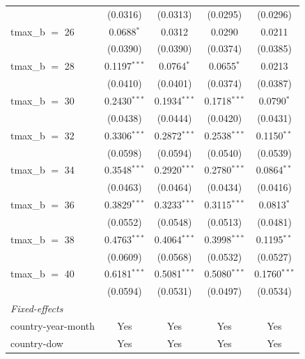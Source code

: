 \begin{tabular}{lcccc}
                      & (0.0316)       & (0.0313)         & (0.0295)            & (0.0296)\\   
   tmax\_b $=$ 26     & 0.0688$^{*}$   & 0.0312           & 0.0290              & 0.0211\\   
                      & (0.0390)       & (0.0390)         & (0.0374)            & (0.0385)\\   
   tmax\_b $=$ 28     & 0.1197$^{***}$ & 0.0764$^{*}$     & 0.0655$^{*}$        & 0.0213\\   
                      & (0.0410)       & (0.0401)         & (0.0374)            & (0.0387)\\   
   tmax\_b $=$ 30     & 0.2430$^{***}$ & 0.1934$^{***}$   & 0.1718$^{***}$      & 0.0790$^{*}$\\   
                      & (0.0438)       & (0.0444)         & (0.0420)            & (0.0431)\\   
   tmax\_b $=$ 32     & 0.3306$^{***}$ & 0.2872$^{***}$   & 0.2538$^{***}$      & 0.1150$^{**}$\\   
                      & (0.0598)       & (0.0594)         & (0.0540)            & (0.0539)\\   
   tmax\_b $=$ 34     & 0.3548$^{***}$ & 0.2920$^{***}$   & 0.2780$^{***}$      & 0.0864$^{**}$\\   
                      & (0.0463)       & (0.0464)         & (0.0434)            & (0.0416)\\   
   tmax\_b $=$ 36     & 0.3829$^{***}$ & 0.3233$^{***}$   & 0.3115$^{***}$      & 0.0813$^{*}$\\   
                      & (0.0552)       & (0.0548)         & (0.0513)            & (0.0481)\\   
   tmax\_b $=$ 38     & 0.4763$^{***}$ & 0.4064$^{***}$   & 0.3998$^{***}$      & 0.1195$^{**}$\\   
                      & (0.0609)       & (0.0568)         & (0.0532)            & (0.0527)\\   
   tmax\_b $=$ 40     & 0.6181$^{***}$ & 0.5081$^{***}$   & 0.5080$^{***}$      & 0.1760$^{***}$\\   
                      & (0.0594)       & (0.0531)         & (0.0497)            & (0.0534)\\   
   \midrule
   \emph{Fixed-effects}\\
   country-year-month & Yes            & Yes              & Yes                 & Yes\\  
   country-dow        & Yes            & Yes              & Yes                 & Yes\\  

\end{tabular}
